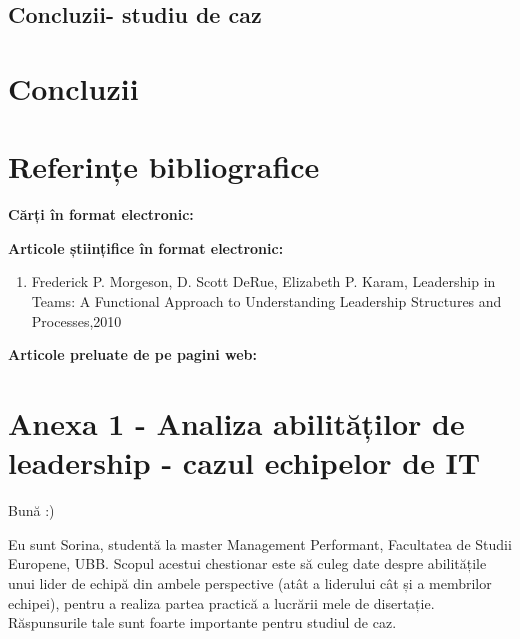 \documentclass[a4paper, 12pt]{article}
\begin{document}
\newpage
	\subsection{ Concluzii- studiu de caz} 



\newpage

\setcounter{section}{3}
	\section{Concluzii}	


\newpage

	\section*{Referințe bibliografice}
	\space
	\bigskip
	\bigskip

	\textbf{Cărți în format electronic:}
	

	\textbf{Articole științifice în format electronic:}
	\begin{enumerate}[1.]
		\item Frederick P. Morgeson, D. Scott DeRue, Elizabeth P. Karam, Leadership in Teams: A Functional Approach to Understanding Leadership Structures and Processes,2010 
	\end{enumerate}

	\textbf{Articole preluate de pe pagini web:}




\newpage
	\section*{Anexa 1 - Analiza abilităților de leadership - cazul echipelor de IT }	

	\thispagestyle{empty}
	 
	\qquad\space Bună :)

      \quad Eu sunt Sorina, studentă la master Management Performant, Facultatea de Studii Europene, UBB. Scopul acestui chestionar este să culeg date despre abilitățile unui lider de echipă din ambele perspective (atât a liderului cât și a membrilor echipei), pentru a realiza partea practică a lucrării mele de disertație. Răspunsurile tale sunt foarte importante pentru studiul de caz.
\end{document}
